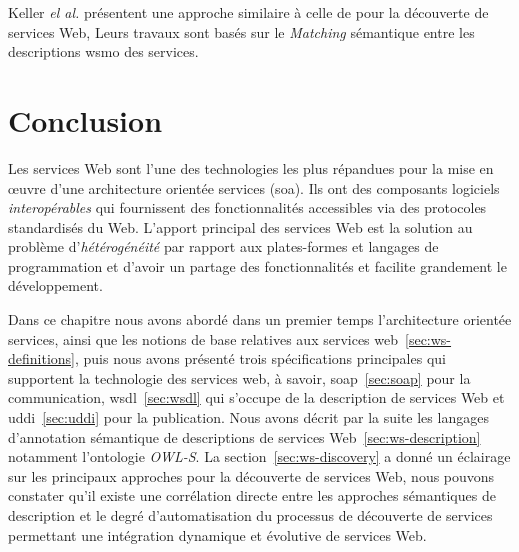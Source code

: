     Keller \emph{el al.} \cite{keller2004wsmo, keller2005automatic}
    présentent une approche similaire à celle de
    \cite{paolucci2002semantic} pour la découverte de services Web,
    Leurs travaux sont basés sur le \textit{Matching} sémantique entre
    les descriptions \acrshort{wsmo} des services.\bigskip

\section*{Conclusion}
\label{sec:conclusion}
 
Les services Web sont l'une des technologies les plus répandues pour
la mise en œuvre d'une architecture orientée services
(\acrshort{soa}). Ils ont des composants logiciels
\textit{interopérables} qui fournissent des fonctionnalités
accessibles via des protocoles standardisés du Web. L'apport principal
des services Web est la solution au problème d'\textit{hétérogénéité}
par rapport aux plates-formes et langages de programmation et d'avoir
un partage des fonctionnalités et facilite grandement le
développement.\medskip

Dans ce chapitre nous avons abordé dans un premier temps
l'architecture orientée services, ainsi que les notions de base
relatives aux services web~\ref{sec:ws-definitions}, puis nous avons
présenté trois spécifications principales qui supportent la
technologie des services web, à savoir, \acrshort{soap}~\ref{sec:soap}
pour la communication, \acrshort{wsdl}~\ref{sec:wsdl} qui s'occupe de
la description de services Web et \acrshort{uddi}~\ref{sec:uddi} pour
la publication. Nous avons décrit par la suite les langages
d'annotation sémantique de descriptions de services
Web~\ref{sec:ws-description} notamment l'ontologie \textit{OWL-S}. La
section~\ref{sec:ws-discovery} a donné un éclairage sur les principaux
approches pour la découverte de services Web, nous pouvons constater
qu'il existe une corrélation directe entre les approches sémantiques
de description et le degré d'automatisation du processus de découverte
de services permettant une intégration dynamique et évolutive de
services Web.

